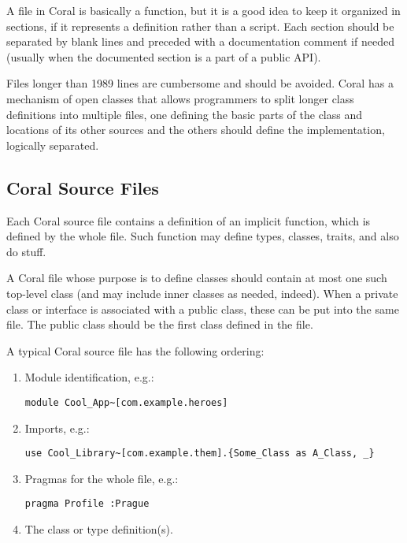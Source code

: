 A file in Coral is basically a function, but it is a good idea to keep it organized in sections, if it represents a definition rather than a script. Each section should be separated by blank lines and preceded with a documentation comment if needed (usually when the documented section is a part of a public API). 

Files longer than 1989 lines are cumbersome and should be avoided. Coral has a mechanism of open classes that allows programmers to split longer class definitions into multiple files, one defining the basic parts of the class and locations of its other sources and the others should define the implementation, logically separated. 





\subsection{Coral Source Files}

Each Coral source file contains a definition of an implicit function, which is defined by the whole file. Such function may define types, classes, traits, and also do stuff. 

A Coral file whose purpose is to define classes should contain at most one such top-level class (and may include inner classes as needed, indeed). When a private class or interface is associated with a public class, these can be put into the same file. The public class should be the first class defined in the file. 

A typical Coral source file has the following ordering: 
\begin{enumerate}
\item Module identification, e.g.:
\begin{lstlisting}
module Cool_App~[com.example.heroes]
\end{lstlisting}

\item Imports, e.g.:
\begin{lstlisting}
use Cool_Library~[com.example.them].{Some_Class as A_Class, _}
\end{lstlisting}

\item Pragmas for the whole file, e.g.:
\begin{lstlisting}
pragma Profile :Prague
\end{lstlisting}

\item The class or type definition(s). 
\end{enumerate}







